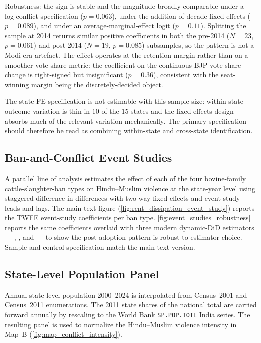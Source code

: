 \documentclass[11pt,twoside]{extarticle}
\begin{document}
Robustness: the sign is stable and the magnitude broadly comparable under a
log-conflict specification ($p=0.063$), under the addition of decade fixed
effects ($p=0.089$), and under an average-marginal-effect logit
($p=0.11$). Splitting the sample at 2014 returns similar positive
coefficients in both the pre-2014 ($N=23$, $p=0.061$) and post-2014
($N=19$, $p=0.085$) subsamples, so the pattern is not a Modi-era
artefact. The effect operates at the retention margin rather than on a
smoother vote-share metric: the coefficient on the continuous BJP
vote-share change is right-signed but insignificant ($p=0.36$), consistent
with the seat-winning margin being the discretely-decided object.

The state-FE specification is not estimable with this sample size:
within-state outcome variation is thin in $10$ of the $15$ states and the
fixed-effects design absorbs much of the relevant variation mechanically.
The primary specification should therefore be read as combining
within-state and cross-state identification.

\subsection{Ban-and-Conflict Event Studies} \label{app:event_studies}

A parallel line of analysis estimates the effect of each of the four
bovine-family cattle-slaughter-ban types on Hindu--Muslim violence at the
state-year level using staggered difference-in-differences with two-way
fixed effects and event-study leads and lags. The main-text figure
(\autoref{fig:rent_dissipation_event_study}) reports the TWFE event-study
coefficients per ban type. \autoref{fig:event_studies_robustness} reports
the same coefficients overlaid with three modern dynamic-DiD estimators
--- \citet*{cengizEffectMinimumWages2019}, \citet*{gardnerTwostageDifferencesDifferences2022}, and \citet*{liuPracticalGuideCounterfactual2024} ---
to show the post-adoption pattern is robust to estimator choice. Sample
and control specification match the main-text version.



\subsection{State-Level Population Panel} \label{app:population}

Annual state-level population 2000--2024 is interpolated from
Census~2001 and Census~2011 enumerations. The 2011 state shares of the
national total are carried forward annually by rescaling to the World Bank
\texttt{SP.POP.TOTL} India series. The resulting panel is used to
normalize the Hindu--Muslim violence intensity in Map~B
(\autoref{fig:map_conflict_intensity}).
\end{document}
